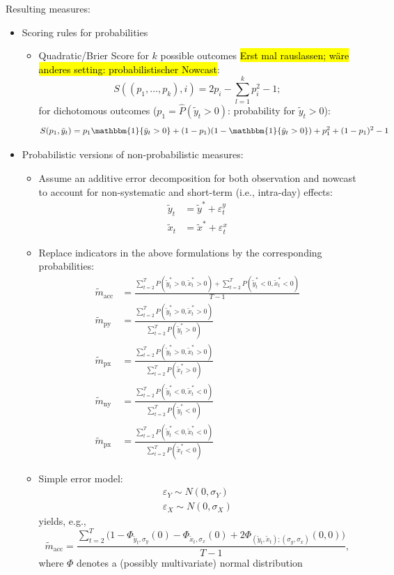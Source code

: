 \documentclass[oneside]{article}
\theoremstyle{plain}%
\theoremstyle{definition}
\newcommand{\ind}[1]{\mathbbm{1}\{#1\}}
\newcommand{\ydiff}{\tilde{y}}
\newcommand{\ydifft}{\tilde{y}^*}
\newcommand{\xdiff}{\tilde{x}}
\newcommand{\xdifft}{\tilde{x}^*}
\newcommand{\Prob}[1]{P(#1)}
\newcommand{\mprob}{\tilde{m}}
\begin{document}
Resulting measures:
\begin{itemize}
  \item Scoring rules for probabilities

\begin{itemize}
  \item Quadratic/Brier Score for $k$ possible outcomes \hl{Erst mal rauslassen; wäre anderes setting: probabilistischer Nowcast}: \begin{equation}
  S((p_1, \dots, p_k), i) = 2 p_i - \sum_{l=1}^k p_i^2 - 1;
\end{equation}
for dichotomous outcomes ($p_1 = \hat{P}(\ydiff_t > 0)$: probability for $\ydiff_t > 0$):
\begin{equation}
  S(p_1, \ydiff_t) = p_1 \ind{\ydiff_t > 0} + (1 - p_1) (1 - \ind{\ydiff_t > 0}) + p_1^2 + (1-p_1)^2 - 1
\end{equation}
\end{itemize}
\item Probabilistic versions of non-probabilistic measures:
\begin{itemize}
  \item Assume an additive error decomposition for both observation and nowcast to account for non-systematic and short-term (i.e., intra-day) effects:
  	\begin{align}
  		\ydiff_t &= \ydifft + \varepsilon_t^y \\
  		\xdiff_t &= \xdifft + \varepsilon_t^x
	\end{align}
\item  Replace indicators in the above formulations by the corresponding probabilities:
\begin{align}
		\mprob_{\text{acc}} &= \frac{\sum_{t=2}^T \Prob{ \ydifft_t > 0, \xdifft_t > 0} + \sum_{t=2}^T \Prob{\ydifft_t < 0, \xdifft_t < 0}}{T-1}  \\
   \mprob_{\text{py}} &= \frac{\sum_{t=2}^T \Prob{\ydifft_t > 0, \xdifft_t > 0}}{\sum_{t=2}^T \Prob{\ydifft_t > 0}} \\
    \mprob_{\text{px}} &= \frac{\sum_{t=2}^T \Prob{\ydifft_t > 0, \xdifft_t > 0}}{\sum_{t=2}^T \Prob{\xdifft_t > 0}} \\
    \mprob_{\text{ny}} &= \frac{\sum_{t=2}^T \Prob{\ydifft_t < 0, \xdifft_t < 0}}{\sum_{t=2}^T \Prob{\ydifft_t < 0}} \\
    \mprob_{\text{px}} &= \frac{\sum_{t=2}^T \Prob{\ydifft_t < 0, \xdifft_t < 0}}{\sum_{t=2}^T \Prob{\xdifft_t < 0}} 
\end{align}
\item Simple error model:
  \begin{align}
	  \varepsilon_Y \sim N(0, \sigma_Y) \\
	  \varepsilon_X \sim N(0, \sigma_X)
  \end{align}
  yields, e.g.,
  	\begin{equation}
  		\mprob_{\text{acc}} = \frac{\sum_{t=2}^T  \big( 1 - \Phi_{\ydiff_t, \sigma_y}(0) - \Phi_{\xdiff_t, \sigma_x} (0) + 2 \Phi_{(\ydiff_t, \xdiff_t); (\sigma_y, \sigma_x)}( 0, 0) \big) }{T-1}, 
	\end{equation}
	where $\Phi$ denotes a (possibly multivariate) normal distribution
\end{itemize}
\end{itemize}
\end{document}
